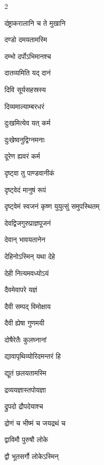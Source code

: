 \begin{multicols}{2}
\begin{indexlist}
\item दंष्ट्राकरालानि च ते मुखानि \dotfill {}
\item दण्डो दमयतामस्मि \dotfill {}
\item दम्भो दर्पोऽभिमानश्च \dotfill {}
\item दातव्यमिति यद् दानं \dotfill {}
\item दिवि सूर्यसहस्रस्य \dotfill {}
\item दिव्यमाल्याम्बरधरं \dotfill {}
\item दुःखमित्येव यत् कर्म \dotfill {}
\item दुःखेष्वनुद्विग्नमनाः \dotfill {}
\item दूरेण ह्यवरं कर्म \dotfill {}
\item दृष्ट्वा तु पाण्डवानीकं \dotfill {}
\item दृष्ट्वेदं मानुषं रूपं \dotfill {}
\item दृष्ट्वेमं स्वजनं कृष्ण युयुत्सुं समुपस्थितम् \dotfill {}
\item देवद्विजगुरुप्राज्ञपूजनं \dotfill {}
\item देवान् भावयतानेन \dotfill {}
\item देहिनोऽस्मिन् यथा देहे \dotfill {}
\item देही नित्यमवध्योऽयं \dotfill {}
\item दैवमेवापरे यज्ञं \dotfill {}
\item दैवी सम्पद् विमोक्षाय \dotfill {}
\item दैवी ह्येषा गुणमयी \dotfill {}
\item दोषैरेतैः कुलघ्नानां \dotfill {}
\item द्यावापृथिव्योरिदमन्तरं हि \dotfill {}
\item द्यूतं छलयतामस्मि \dotfill {}
\item द्रव्ययज्ञास्तपोयज्ञा \dotfill {}
\item द्रुपदो द्रौपदेयाश्च \dotfill {}
\item द्रोणं च भीष्मं च जयद्रथं च \dotfill {}
\item द्वाविमौ पुरुषौ लोके \dotfill {}
\item द्वौ भूतसर्गौ लोकेऽस्मिन् \dotfill {}
\end{indexlist}


\end{multicols}
